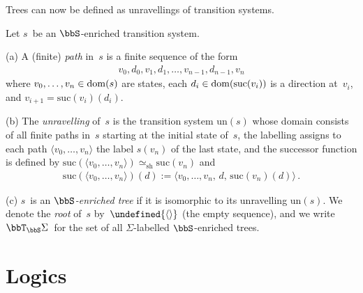 \documentclass[10pt, fleqn]{scrartcl}
\makeatletter
\newcommand\m@thsm@ller[2]{\mbox{\relscale{0.91}$\m@th#1#2$}}
\let\smaller\undefined
\DeclareRobustCommand\smaller[1]{\relax\ifmmode{\mathpalette\m@thsm@ller{#1}}\else{\relscale{0.91}#1}\fi}
\DeclareRobustCommand*{\dom}{\qopname\relax o{dom}}
\newcommand*{\sh}{\mathrm{sh}}
\newcommand*{\suc}{\mathrm{suc}}
\newcommand*{\un}{\mathrm{un}}
\newcommand*{\emptyseq}{\smaller{\langle\rangle}}
\newcommand*{\?}{\kern .08em}
\makeatother
\begin{document}
Trees can now be defined as unravellings of transition systems.
\begin{Def}
Let $s$~be an $\bbS$-enriched transition system.

(a) A (finite) \emph{path} in~$s$ is a finite sequence of the form
\begin{align*}
  v_0,d_0,v_1,d_1,\dots,v_{n-1},d_{n-1},v_n
\end{align*}
where $v_0,\dots,v_n \in \dom(s)$ are states, each $d_i \in \dom(\suc(v_i))$ is a direction
at~$v_i$, and $v_{i+1} = \suc(v_i)(d_i)$.

(b)
The \emph{unravelling} of~$s$ is the transition system
$\un(s)$ whose domain consists of all finite paths in~$s$ starting at the initial state of~$s$,
the labelling assigns to each path $\langle v_0,\dots,v_n\rangle$ the label $s(v_n)$
of the last state, and the successor function is defined by
$\suc(\langle v_0,\dots,v_n\rangle) \simeq_\sh \suc(v_n)$ and
\begin{align*}
  \suc(\langle v_0,\dots,v_n\rangle)(d) := \langle v_0,\dots,v_n,\,d,\,\suc(v_n)(d)\rangle\,.
\end{align*}

(c) $s$~is an \emph{$\bbS$-enriched tree} if it is isomorphic to its unravelling $\un(s)$.
We denote the \emph{root} of~$s$ by~$\emptyseq$ (the empty sequence),
and we write $\bbT_\bbS\Sigma$~for the set of all $\Sigma$-labelled $\bbS$-enriched trees.
\end{Def}


\section{Logics}   %
\label{Sect: logic}
\end{document}
